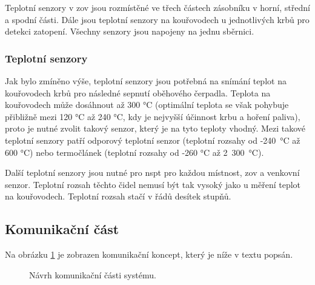 Teplotní senzory v \acrshort{zov} jsou rozmístěné ve třech částech zásobníku v horní, střední a spodní části. Dále jsou teplotní senzory na kouřovodech u jednotlivých krbů pro detekci zatopení. Všechny senzory jsou napojeny na jednu sběrnici.



\subsubsection{Teplotní senzory}
Jak bylo zmíněno výše, teplotní senzory jsou potřebná na snímání teplot na kouřovodech krbů pro následné sepnutí oběhového čerpadla. Teplota na kouřovodech může dosáhnout až 300 °C (optimální teplota se však pohybuje přibližně mezi 120 °C až 240 °C, kdy je nejvyšší účinnost krbu a hoření paliva), proto je nutné zvolit takový senzor, který je na tyto teploty vhodný. Mezi takové teplotní senzory patří odporový teplotní senzor (teplotní rozsahy od -240~°C až 600 °C) nebo termočlánek (teplotní rozsahy od -260 °C až 2~300~°C). %


Další teplotní senzory jsou nutné pro \acrshort{nspt} pro každou místnost, \acrshort{zov} a venkovní senzor. Teplotní rozsah těchto čidel nemusí být tak vysoký jako u měření teplot na kouřovodech. Teplotní rozsah stačí v řádů desítek stupňů. %

\subsection{Komunikační část}

Na obrázku \ref{fig:navrh-softwarove-casti} je zobrazen komunikační koncept, který je níže v textu popsán.

\begin{figure}[H]
    \centering
    \def\svgwidth{\columnwidth}
    
    \caption{Návrh komunikační části systému.}
    \label{fig:navrh-softwarove-casti}
\end{figure}


